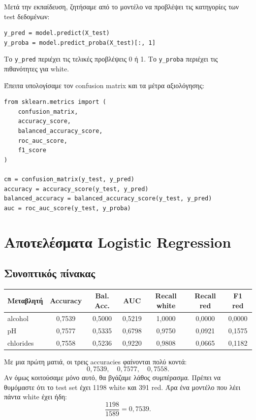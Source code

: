 \documentclass[11pt,a4paper]{article}
\newcommand{\code}[1]{\texttt{#1}}
\begin{document}
Μετά την εκπαίδευση, ζητήσαμε από το μοντέλο να προβλέψει τις κατηγορίες
των test δεδομένων:

\begin{lstlisting}
y_pred = model.predict(X_test)
y_proba = model.predict_proba(X_test)[:, 1]
\end{lstlisting}

Το \code{y\_pred} περιέχει τις τελικές προβλέψεις 0 ή 1. Το \code{y\_proba}
περιέχει τις πιθανότητες για white.

Έπειτα υπολογίσαμε τον confusion matrix και τα μέτρα αξιολόγησης:

\begin{lstlisting}
from sklearn.metrics import (
    confusion_matrix,
    accuracy_score,
    balanced_accuracy_score,
    roc_auc_score,
    f1_score
)

cm = confusion_matrix(y_test, y_pred)
accuracy = accuracy_score(y_test, y_pred)
balanced_accuracy = balanced_accuracy_score(y_test, y_pred)
auc = roc_auc_score(y_test, y_proba)
\end{lstlisting}

\section{Αποτελέσματα Logistic Regression}

\subsection{Συνοπτικός πίνακας}

\begin{center}
\begin{tabular}{lcccccc}
\toprule
Μεταβλητή & Accuracy & Bal. Acc. & AUC & Recall white & Recall red & F1 red \\
\midrule
alcohol & 0,7539 & 0,5000 & 0,5219 & 1,0000 & 0,0000 & 0,0000 \\
pH & 0,7577 & 0,5335 & 0,6798 & 0,9750 & 0,0921 & 0,1575 \\
chlorides & 0,7558 & 0,5236 & 0,9220 & 0,9808 & 0,0665 & 0,1182 \\
\bottomrule
\end{tabular}
\end{center}

Με μια πρώτη ματιά, οι τρεις accuracies φαίνονται πολύ κοντά:
\[
0{,}7539,\quad 0{,}7577,\quad 0{,}7558.
\]
Αν όμως κοιτούσαμε μόνο αυτό, θα βγάζαμε λάθος συμπέρασμα. Πρέπει να θυμόμαστε
ότι το test set έχει 1198 white και 391 red. Άρα ένα μοντέλο που λέει πάντα
white έχει ήδη:
\[
\frac{1198}{1589} = 0{,}7539.
\]
\end{document}
